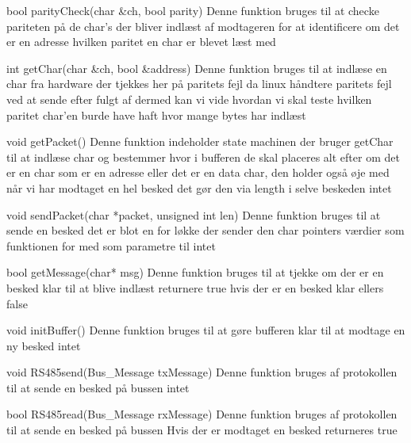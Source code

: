 \funk
{bool parityCheck(char \&ch, bool parity) }
{Denne funktion bruges til at checke pariteten på de char's der bliver indlæst af modtageren for at identificere om det er en adresse}
{hvilken paritet en char er blevet læst med}
{
}

\funk
{int getChar(char \&ch, bool \&address) }
{Denne funktion bruges til at indlæse en char fra hardware der tjekkes her på paritets fejl da linux håndtere paritets fejl ved at sende  efter fulgt af  dermed kan vi vide hvordan vi skal teste hvilken paritet char'en burde have haft}
{hvor mange bytes  har indlæst}
{
}

\funk
{void getPacket()}
{Denne funktion indeholder state machinen der bruger getChar til at indlæse char og bestemmer hvor i bufferen de skal placeres alt efter om det er en char som er en adresse eller det er en data char, den holder også øje med når vi har modtaget en hel besked det gør den via length i selve beskeden}
{intet}
{
}

\funk
{void sendPacket(char *packet, unsigned int len)}
{Denne funktion bruges til at sende en besked det er blot en for løkke der sender den char pointers værdier som funktionen for med som parametre til }
{intet}
{
}

\funk
{bool getMessage(char* msg)}
{Denne funktion bruges til at tjekke om der er en besked klar til at blive indlæst}
{returnere true hvis der er en besked klar ellers false}
{
}

\funk
{void initBuffer()}
{Denne funktion bruges til at gøre bufferen klar til at modtage en ny besked}
{intet}
{
}

\funk
{void RS485send(Bus\_Message\* txMessage)}
{Denne funktion bruges af protokollen til at sende en besked på bussen}
{intet}
{
}

\funk
{bool RS485read(Bus\_Message\* rxMessage)}
{Denne funktion bruges af protokollen til at sende en besked på bussen}
{Hvis der er modtaget en besked returneres true}
{
}


